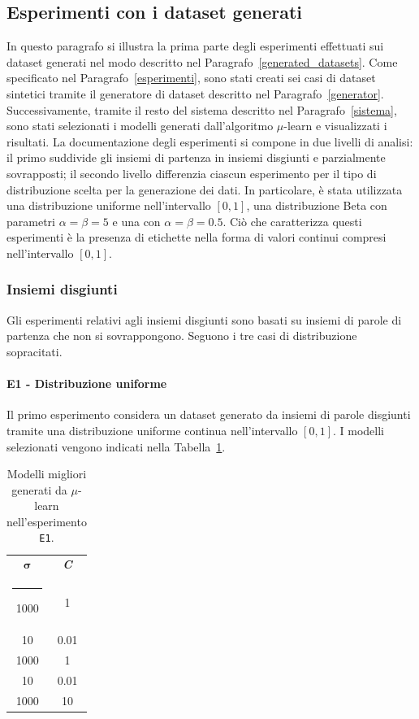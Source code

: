 \documentclass[12pt]{report}
\makeatletter
\theoremstyle{definition}
\newcommand{\thickhline}{%
    \noalign {\ifnum 0=`}\fi \hrule height 1pt
    \futurelet \reserved@a \@xhline
}
\makeatother
\begin{document}
\subsection{Esperimenti con i dataset generati}
In questo paragrafo si illustra la prima parte degli esperimenti effettuati sui dataset generati nel modo descritto nel Paragrafo~\ref{generated_datasets}. Come specificato nel Paragrafo~\ref{esperimenti}, sono stati creati sei casi di dataset sintetici tramite il generatore di dataset descritto nel Paragrafo~\ref{generator}. Successivamente, tramite il resto del sistema descritto nel Paragrafo~\ref{sistema}, sono stati selezionati i modelli generati dall'algoritmo $\mu$-learn e visualizzati i risultati.
La documentazione degli esperimenti si compone in due livelli di analisi: il primo suddivide gli insiemi di partenza in insiemi disgiunti e parzialmente sovrapposti; il secondo livello differenzia ciascun esperimento per il tipo di distribuzione scelta per la generazione dei dati. In particolare, è stata utilizzata una distribuzione uniforme nell'intervallo $[0,1]$, una distribuzione Beta con parametri $\alpha = \beta = 5$ e una con $\alpha = \beta = 0.5$. Ciò che caratterizza questi esperimenti è la presenza di etichette nella forma di valori continui compresi nell'intervallo $[0,1]$.

\subsubsection{Insiemi disgiunti}\label{insiemidisgiunti}
Gli esperimenti relativi agli insiemi disgiunti sono basati su insiemi di parole di partenza che non si sovrappongono. Seguono i tre casi di distribuzione sopracitati.

\paragraph{E1 - Distribuzione uniforme} Il primo esperimento considera un dataset generato da insiemi di parole disgiunti tramite una distribuzione uniforme continua nell'intervallo $[0,1]$. I modelli selezionati vengono indicati nella Tabella~\ref{models_exp1}.
\begin{table}
\centering
\begin{adjustbox}{max width=\textwidth}
 \begin{tabular}{|c|c|} 
 \hline $\bm{\sigma}$ & \textit{\textbf{C}}
\\ [0.5ex] 
 \thickhline
 1000 & 1 \\
 10 & 0.01 \\
 1000 & 1 \\
 10 & 0.01 \\
 1000 & 10 \\
 \hline
\end{tabular}
\end{adjustbox}
\caption{Modelli migliori generati da $\mu$-learn nell'esperimento \texttt{E1}.}
\label{models_exp1}
\end{table}
\end{document}
